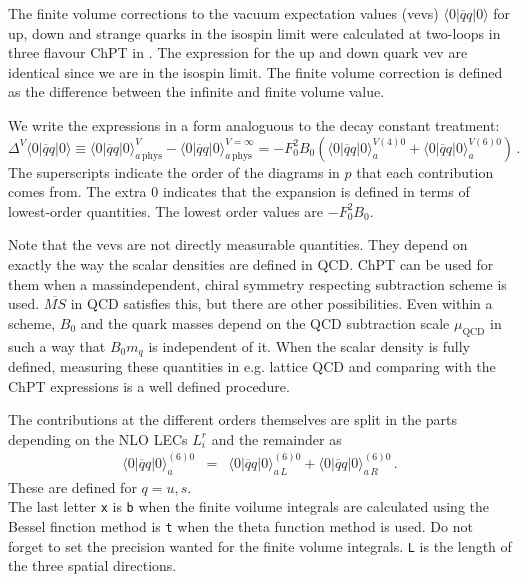 \documentclass[12pt,a4paper]{article}
\newcommand{\mytt}[1]{\texttt{#1}}
\begin{document}
The finite volume corrections to the vacuum expectation values (vevs)
$\langle0\vert \overline q q \vert 0\rangle$
for up, down and strange quarks in the isospin limit
were  calculated at two-loops in three flavour ChPT
in \cite{Bijnens:2006ve}.
The expression for the up and down quark vev are identical since we
are in the isospin limit.
The finite volume correction is defined as the difference between
the infinite and finite volume value.

We write the expressions in a form analoguous to the decay constant
treatment:
\begin{equation}
\Delta^V\langle0\vert \overline q q \vert 0\rangle
\equiv
\langle0\vert \overline q q \vert 0\rangle_{a\,\mathrm{phys}}^V
-\langle0\vert \overline q q \vert 0\rangle_{a\,\mathrm{phys}}^{V=\infty}
 =
- F_0^2 B_0\left(\langle0\vert \overline q q \vert 0\rangle_a^{V(4)0}+
\langle0\vert \overline q q \vert 0\rangle_a^{V(6)0}\right)\,.
\end{equation}
The superscripts indicate the order of the diagrams in $p$ that each
contribution comes from. The extra $0$ indicates that the expansion
is defined in terms of lowest-order quantities.
The lowest order values are $-F_0^2 B_0$.

Note that the vevs are not directly measurable quantities. They depend
on exactly the way the scalar densities are defined in QCD. ChPT can be
used for them when a massindependent, chiral symmetry respecting subtraction
scheme is used. $\overline{MS}$ in QCD satisfies this, but there are other
possibilities. Even within a scheme, $B_0$ and the quark masses depend
on the QCD subtraction scale $\mu_\textrm{QCD}$ in such a way that
$B_0 m_q$ is independent of it. 
When the scalar density is fully defined, measuring these quantities in
e.g. lattice QCD and comparing with the ChPT expressions is a well defined
procedure.

The contributions at the different orders themselves are split in the parts
depending on the NLO LECs $L_i^r$ and the
remainder as
\begin{eqnarray}
\label{defvevloV}
\langle0\vert \overline q q \vert 0\rangle_a^{(6)0}&=&
\langle0\vert \overline q q \vert 0\rangle_{a\,L}^{(6)0}
+\langle0\vert \overline q q \vert 0\rangle_{a\,R}^{(6)0}\,.
\end{eqnarray}
These are defined for $q=u,s$.\\

The last letter \mytt{x} is \mytt{b} when the finite voilume integrals
are calculated using the Bessel finction method is \mytt{t} when the
theta function method is used. Do not forget to set the precision wanted for
the finite volume integrals.
\mytt{L} is the length of the three spatial directions.
\end{document}
